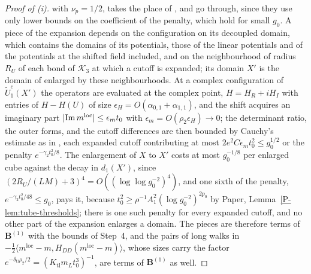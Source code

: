 \documentclass[11pt]{preprint}
\DeclarePairedDelimiter{\abs}{\lvert}{\rvert}
\numberwithin{equation}{section}
\theoremstyle{definition}
\theoremstyle{remark}
\theoremstyle{plain}
\begin{document}
\begin{proof}[Proof of (i)]
with $\nu_p = 1/2$, takes the place of \cite[(2.22), p.~16]{BalabanRG2}, and \cite[(2.22)--(2.37), pp.~16--20]{BalabanRG2} go through, since they use only lower bounds on the coefficient of the penalty, which hold for small $g_0$. A piece of the expansion depends on the configuration on its decoupled domain, which contains the domains of its potentials, those of the linear potentials and of the potentials at the shifted field included, and on the neighbourhood of radius $R_U$ of each bond of $\mathcal K_3$ at which a cutoff is expanded; its domain $X'$ is the domain of \cite{BalabanRG2} enlarged by these neighbourhoods. At a complex configuration of $\tilde U^c_1(X')$ the operators are evaluated at the complex point, $H = H_R + iH_I$ with entries of $H - H(U)$ of size $\epsilon_H = O(\alpha_{0,1} + \alpha_{1,1})$, and the shift acquires an imaginary part $\abs{\operatorname{Im}m^{\mathrm{loc}}} \leq \epsilon_mt_0$ with $\epsilon_m = O(\rho_2\epsilon_H) \to 0$; the determinant ratio, the outer forms, and the cutoff differences are then bounded by Cauchy's estimate as in \cite[(2.15)--(2.17), p.~16]{BalabanRG2}, each expanded cutoff contributing at most $2e^2C\epsilon_mt_0^2 \leq g_0^{1/2}$ or the penalty $e^{-\gamma_2t_0^2/8}$. The enlargement of $X$ to $X'$ costs at most $g_0^{-1/8}$ per enlarged cube against the decay in $d_1(X')$, since $(2R_U/(LM) + 3)^4 = O((\log\log g_0^{-2})^4)$, and one sixth of the penalty, $e^{-\gamma_2t_0^2/48} \leq g_0$, pays it, because $t_0^2 \geq \rho^{-1}A_1^2(\log g_0^{-2})^{2p_0}$ by Paper, Lemma~\ref{P-lem:tube-thresholds}; there is one such penalty for every expanded cutoff, and no other part of the expansion enlarges a domain. The pieces are therefore terms of $\mathbf B^{(1)}$ with the bounds of Step~4, and the pairs of long walks in $-\frac12\langle m^{\mathrm{loc}} - m, H_{DD}(m^{\mathrm{loc}} - m)\rangle$, whose sizes carry the factor $e^{-\delta_{\mathrm{tl}}\rho_2/2} = (K_{\mathrm{tl}}m_Lt_0^3)^{-1}$, are terms of $\mathbf B^{(1)}$ as well.
\end{proof}
\end{document}
